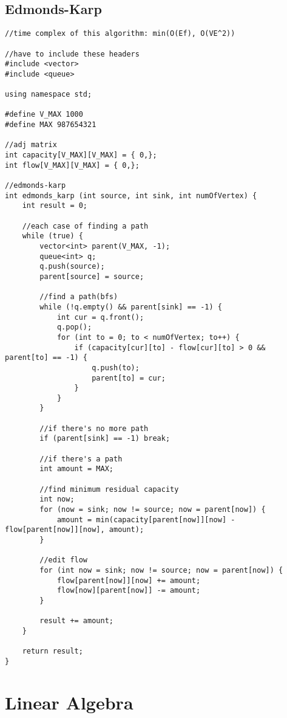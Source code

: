\documentclass[landscape, 8pt, a4paper, oneside, twocolumn]{extarticle}
\begin{document}
\subsection{Edmonds-Karp}
\begin{verbatim}
//time complex of this algorithm: min(O(Ef), O(VE^2))

//have to include these headers
#include <vector>
#include <queue>

using namespace std;

#define V_MAX 1000
#define MAX 987654321

//adj matrix
int capacity[V_MAX][V_MAX] = { 0,};
int flow[V_MAX][V_MAX] = { 0,};

//edmonds-karp
int edmonds_karp (int source, int sink, int numOfVertex) {
    int result = 0;

    //each case of finding a path
    while (true) {
        vector<int> parent(V_MAX, -1);
        queue<int> q;
        q.push(source);
        parent[source] = source;

        //find a path(bfs)
        while (!q.empty() && parent[sink] == -1) {
            int cur = q.front();
            q.pop();
            for (int to = 0; to < numOfVertex; to++) {
                if (capacity[cur][to] - flow[cur][to] > 0 && parent[to] == -1) {
                    q.push(to);
                    parent[to] = cur;
                }
            }
        }

        //if there's no more path
        if (parent[sink] == -1) break;

        //if there's a path
        int amount = MAX;

        //find minimum residual capacity
        int now;
        for (now = sink; now != source; now = parent[now]) {
            amount = min(capacity[parent[now]][now] - flow[parent[now]][now], amount);
        }

        //edit flow
        for (int now = sink; now != source; now = parent[now]) {
            flow[parent[now]][now] += amount;
            flow[now][parent[now]] -= amount;
        }

        result += amount;
    }

    return result;
}
\end{verbatim}

\section{Linear Algebra}
\end{document}
